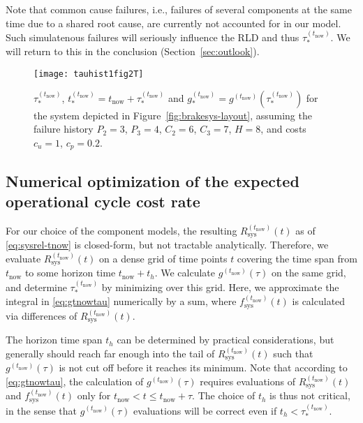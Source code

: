 \documentclass[authoryear]{elsarticle}
\def\tnow{t_\text{now}}
\newcommand{\Rsysnow}{R^{(t_\text{now})}_\text{sys}}
\newcommand{\fsysnow}{f^{(t_\text{now})}_\text{sys}}
\newcommand{\gnow}{g^{(\tnow)}}
\newcommand{\tausnow}{\tau_*^{(\tnow)}}
\newcommand{\tstarnow}{t_*^{(\tnow)}}
\newcommand{\gstarnow}{g_*^{(\tnow)}}
\newcommand{\gtotalnow}{g_\text{total}^{(\tnow)}}
\begin{document}
Note that common cause failures, i.e., failures of several components at the same time due to a shared root cause,
are currently not accounted for in our model. %
Such simulatenous failures will seriously influence the RLD and thus $\tausnow$.
We will return to this in the conclusion (Section~\ref{sec:outlook}).
%

\begin{figure}
\texttt{[image: tauhist1fig2T]}
\caption[t]{$\tausnow$, $\tstarnow = \tnow + \tausnow$ and $\gstarnow = \gnow(\tausnow)$
for the system depicted in Figure~\ref{fig:brakesys-layout},
assuming the failure history $P_2 = 3$, $P_3 = 4$, $C_2 = 6$, $C_3 = 7$, $H = 8$,
and costs $c_u = 1$, $c_p = 0.2$.}
\label{fig:tauhist1fig2T}
\end{figure}


\subsection{Numerical optimization of the expected operational cycle cost rate}
\label{sec:optim}

For our choice of the component models,
the resulting $\Rsysnow(t)$ as of \eqref{eq:sysrel-tnow}
is closed-form, but not tractable analytically.
Therefore,
we evaluate $\Rsysnow(t)$ on a dense grid of time points $t$
covering the time span from $\tnow$ to some horizon time $\tnow + t_h$.
We calculate $\gnow(\tau)$ on the same grid,
and determine $\tausnow$ by minimizing over this grid.
Here, we approximate the integral in \eqref{eq:gtnowtau} numerically by a sum,
where $\fsysnow(t)$ is calculated via differences of $\Rsysnow(t)$.

The horizon time span $t_h$ can be determined by practical considerations,
but generally should reach far enough into the tail of $\Rsysnow(t)$
such that $\gnow(\tau)$ is not cut off before it reaches its minimum. %
Note that according to \eqref{eq:gtnowtau},
the calculation of $\gnow(\tau)$ requires
evaluations of $\Rsysnow(t)$ and $\fsysnow(t)$ only for $\tnow < t \le \tnow + \tau$.
The choice of $t_h$ is thus not critical,
in the sense that $\gnow(\tau)$ evaluations will be correct even if $t_h < \tausnow$.
\end{document}
